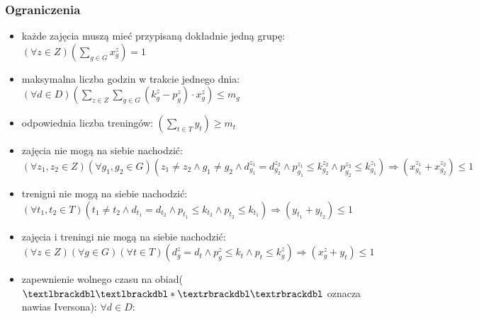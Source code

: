 \documentclass{article}
\begin{document}
\subsubsection{Ograniczenia}
\begin{itemize}
    \item każde zajęcia muszą mieć przypisaną dokładnie jedną grupę: $\displaystyle \left(\forall z \in Z\right) \left(\sum_{g \in G} x^z_g\right) = 1$
    \item maksymalna liczba godzin w trakcie jednego dnia: $\displaystyle \left(\forall d \in D\right) \left(\sum_{z \in Z} \sum_{g \in G} \left(k^z_g - p^z_g\right) \cdot x^z_g \right)\leq m_g$
    \item odpowiednia liczba treningów: $\displaystyle \left(\sum_{t \in T} y_t\right) \geq m_t$
    \item zajęcia nie mogą na siebie nachodzić: \newline $\displaystyle \left(\forall z_1, z_2 \in Z\right) \left(\forall g_1, g_2 \in G\right) \left(z_1 \ne z_2 \land g_1 \neq g_2 \land d^{z_1}_{g_1} = d^{z_2}_{g_2} \land p^{z_1}_{g_1} \leq k^{z_2}_{g_2} \land p^{z_2}_{g_2} \leq k^{z_1}_{g_1} \right) \Rightarrow (x^{z_1}_{g_1} + x^{z_2}_{g_2}) \leq 1$
    \item trenigni nie mogą na siebie nachodzić: \newline $\displaystyle \left(\forall t_1, t_2 \in T\right) \left(t_1 \ne t_2 \land d_{t_1} = d_{t_2} \land p_{t_1} \leq k_{t_2} \land p_{t_2} \leq k_{t_1}\right) \Rightarrow (y_{t_1} + y_{t_2}) \leq 1$
    \item zajęcia i treningi nie mogą na siebie nachodzić: \newline $\displaystyle \left(\forall z \in Z\right) \left(\forall g \in G\right) \left(\forall t \in T\right) \left(d^z_g = d_t \land p^z_g \leq k_t \land p_t \leq k^z_g\right) \Rightarrow (x^z_g + y_t) \leq 1$
    \item zapewnienie wolnego czasu na obiad($\textlbrackdbl\textlbrackdbl * \textrbrackdbl\textrbrackdbl$ oznacza nawias Iversona): $\forall d \in D$:

\end{itemize}
\end{document}
